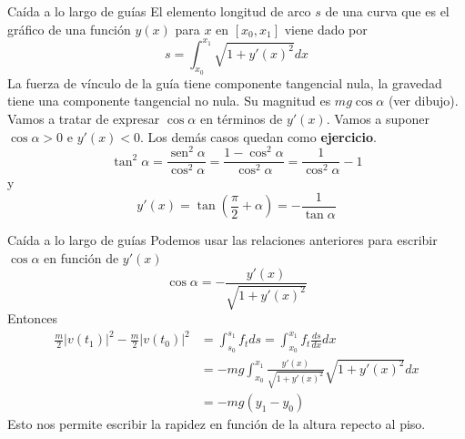 \documentclass[handout,hyperref={colorlinks=true}]{beamer}
\DeclareMathOperator{\sen}{sen}
\begin{document}
\begin{frame}{Caída a lo largo de guías}
El elemento longitud de arco $s$ de una curva que es el gráfico de una función $y(x)$ para $x$ en $[x_0,x_1]$ viene dado por 
\[s=\int_{x_0}^{x_1}\sqrt{1+y'(x)^2}dx\]
La fuerza de vínculo de la guía tiene componente tangencial nula,  la gravedad tiene una componente tangencial no nula. 
Su magnitud es $mg\cos\alpha$ (ver dibujo). Vamos a tratar de expresar $\cos\alpha$  en términos de   $y'(x)$. Vamos a suponer $\cos\alpha>0$ e $y'(x)<0$. 
Los demás casos quedan como \textbf{ejercicio}.
\[ \tan^2\alpha=\frac{\sen^2\alpha}{\cos^2\alpha}=\frac{1-\cos^2\alpha}{\cos^2\alpha}=\frac{1}{\cos^2\alpha}-1\]
y
\[y'(x)=\tan \left(\frac{\pi}{2}+\alpha\right)=-\frac{1}{\tan\alpha}\]

 

\end{frame}


\begin{frame}{Caída a lo largo de guías}
Podemos usar las relaciones anteriores para escribir $\cos\alpha$ en función de $y'(x)$
\begin{equation}\label{cos_alpha}\cos\alpha=-\frac{y'(x)}{\sqrt{1+y'(x)^2}}\end{equation}
Entonces
\begin{equation}\label{cons_ener}
 \begin{split} \frac{m}{2}|v(t_1)|^2-\frac{m}{2}|v(t_0)|^2&=\int_{s_0}^{s_1}f_tds =\int_{x_0}^{x_1}f_t\frac{ds}{dx}dx\\
&= -mg\int_{x_0}^{x_1}\frac{y'(x)}{\sqrt{1+y'(x)^2}}\sqrt{1+y'(x)^2}dx\\
&=-mg\left(y_1-y_0\right)
    \end{split}\end{equation}
Esto nos permite escribir la rapidez en función de la altura repecto al piso.
\end{frame}
\end{document}
